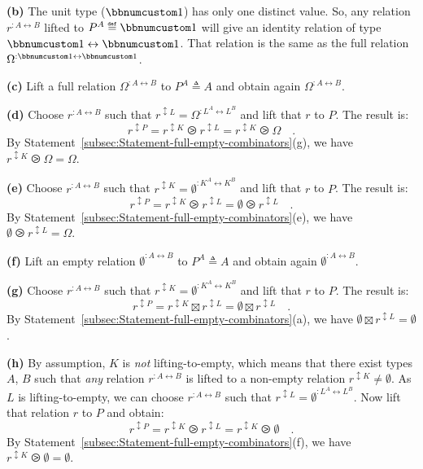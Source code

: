 \textbf{(b)} The unit type ($\bbnum 1$) has only one distinct value.
So, any relation $r^{:A\leftrightarrow B}$ lifted to $P^{A}\triangleq\bbnum 1$
will give an identity relation of type $\bbnum 1\leftrightarrow\bbnum 1$.
That relation is the same as the full relation $\Omega^{:\bbnum 1\leftrightarrow\bbnum 1}$.

\textbf{(c)} Lift a full relation $\Omega^{:A\leftrightarrow B}$
to $P^{A}\triangleq A$ and obtain again $\Omega^{:A\leftrightarrow B}$.

\textbf{(d)} Choose $r^{:A\leftrightarrow B}$ such that $r^{\updownarrow L}=\Omega^{:L^{A}\leftrightarrow L^{B}}$
and lift that $r$ to $P$. The result is:
\[
r^{\updownarrow P}=r^{\updownarrow K}\ogreaterthan r^{\updownarrow L}=r^{\updownarrow K}\ogreaterthan\Omega\quad.
\]
By Statement~\ref{subsec:Statement-full-empty-combinators}(g), we
have $r^{\updownarrow K}\ogreaterthan\Omega=\Omega$.

\textbf{(e)} Choose $r^{:A\leftrightarrow B}$ such that $r^{\updownarrow K}=\emptyset^{:K^{A}\leftrightarrow K^{B}}$
and lift that $r$ to $P$. The result is:
\[
r^{\updownarrow P}=r^{\updownarrow K}\ogreaterthan r^{\updownarrow L}=\emptyset\ogreaterthan r^{\updownarrow L}\quad.
\]
By Statement~\ref{subsec:Statement-full-empty-combinators}(e), we
have $\emptyset\ogreaterthan r^{\updownarrow L}=\Omega$.

\textbf{(f)} Lift an empty relation $\emptyset^{:A\leftrightarrow B}$
to $P^{A}\triangleq A$ and obtain again $\emptyset^{:A\leftrightarrow B}$.

\textbf{(g)} Choose $r^{:A\leftrightarrow B}$ such that $r^{\updownarrow K}=\emptyset^{:K^{A}\leftrightarrow K^{B}}$
and lift that $r$ to $P$. The result is:
\[
r^{\updownarrow P}=r^{\updownarrow K}\boxtimes r^{\updownarrow L}=\emptyset\boxtimes r^{\updownarrow L}\quad.
\]
By Statement~\ref{subsec:Statement-full-empty-combinators}(a), we
have $\emptyset\boxtimes r^{\updownarrow L}=\emptyset$.

\textbf{(h)} By assumption, $K$ is \emph{not} lifting-to-empty, which
means that there exist types $A$, $B$ such that \emph{any} relation
$r^{:A\leftrightarrow B}$ is lifted to a non-empty relation $r^{\updownarrow K}\neq\emptyset$.
As $L$ is lifting-to-empty, we can choose $r^{:A\leftrightarrow B}$
such that $r^{\updownarrow L}=\emptyset^{:L^{A}\leftrightarrow L^{B}}$.
Now lift that relation $r$ to $P$ and obtain:
\[
r^{\updownarrow P}=r^{\updownarrow K}\ogreaterthan r^{\updownarrow L}=r^{\updownarrow K}\ogreaterthan\emptyset\quad.
\]
By Statement~\ref{subsec:Statement-full-empty-combinators}(f), we
have $r^{\updownarrow K}\ogreaterthan\emptyset=\emptyset$.

